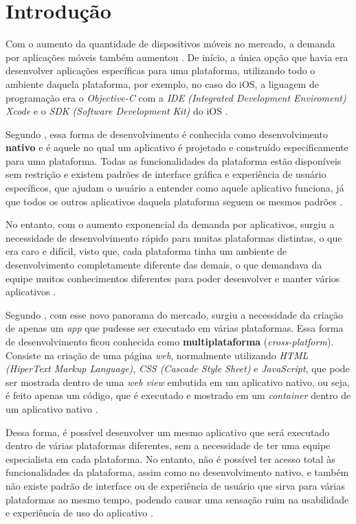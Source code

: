 \chapter{Introdução} \label{cap:introducao}

Com o aumento da quantidade de dispositivos móveis no mercado, a demanda por aplicações móveis também aumentou \cite{cevallos_case_2014}.
De início, a única opção que havia era desenvolver aplicações específicas para uma plataforma, utilizando todo o ambiente daquela plataforma, por exemplo,
no caso do iOS, a liguagem de programação era o \textit{Objective-C} com a \textit{IDE (Integrated Development Enviroment) Xcode} e o \textit{SDK (Software Development Kit)} do iOS \cite{heitkotter_comparing_2013}.

Segundo , essa forma de desenvolvimento é conhecida como desenvolvimento \textbf{nativo} e é aquele no qual um aplicativo é projetado e construído especificamente para uma plataforma. 
Todas as funcionalidades da plataforma estão disponíveis sem restrição e existem padrões de interface gráfica e experiência de usuário específicos, que ajudam o usuário a 
entender como aquele aplicativo funciona, já que todos os outros aplicativos daquela plataforma seguem os mesmos padrões \cite{corral_ant_2012}. 

No entanto, com o aumento exponencial da demanda por aplicativos, surgiu a necessidade de desenvolvimento rápido para muitas plataformas distintas, o que era caro e difícil,
visto que, cada plataforma tinha um ambiente de desenvolvimento completamente diferente das demais, o que demandava da equipe muitos conhecimentos diferentes
para poder desenvolver e manter vários aplicativos \cite{prezotto_estudo_2014}.

Segundo , com esse novo panorama do mercado, surgiu a necessidade da criação de apenas um \textit{app} que pudesse ser executado 
em várias plataformas. Essa forma de desenvolvimento ficou conhecida como \textbf{multiplataforma} (\textit{cross-platform}). 
Consiste na criação de uma página \textit{web}, normalmente utilizando \textit{HTML (HiperText Markup Language)}, \textit{CSS (Cascade Style Sheet)} e \textit{JavaScript}, que pode ser mostrada dentro de uma \textit{web view} 
embutida em um aplicativo nativo, ou seja, é feito apenas um código, que é executado e mostrado em um \textit{container} dentro de um aplicativo nativo \cite{stark_building_2010, heitkotter_comparing_2013}. 

Dessa forma, é possível desenvolver um mesmo aplicativo que será executado dentro de várias plataformas diferentes, sem a necessidade de ter uma equipe especialista em cada plataforma.
No entanto, não é possível ter acesso total às funcionalidades da plataforma, assim como no desenvolvimento nativo, e também não existe padrão de interface ou de experiência de usuário que sirva
para várias plataformas ao mesmo tempo, podendo causar uma sensação ruim na usabilidade e experiência de uso do aplicativo \cite{corral_ant_2012}.

